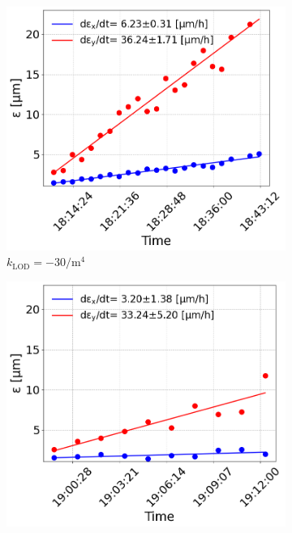  \begin{figure}[htp]
    \centering
    \begin{subfigure}{.4\textwidth}
        \centering
        \includegraphics[width=.95\linewidth]{images/app_c/cc_md_12sep22_coast6.png}  
        \caption{$k_\mathrm{LOD}=-30 \mathrm{/m^{4}}$}
    \end{subfigure}
    \begin{subfigure}{.4\textwidth}
        \centering
        \includegraphics[width=.95\linewidth]{images/app_c/cc_md_12sep22_coast7.png}  

\end{subfigure}
\end{figure}
